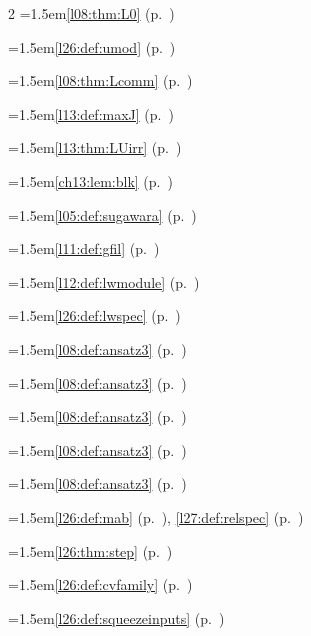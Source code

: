 \begin{multicols}{2}
\hangindent=1.5em\quad \ref{l08:thm:L0} (p.~\pageref{l08:thm:L0})\par
\hangindent=1.5em\quad \ref{l26:def:umod} (p.~\pageref{l26:def:umod})\par
\hangindent=1.5em\quad \ref{l08:thm:Lcomm} (p.~\pageref{l08:thm:Lcomm})\par
\hangindent=1.5em\quad \ref{l13:def:maxJ} (p.~\pageref{l13:def:maxJ})\par
\hangindent=1.5em\quad \ref{l13:thm:LUirr} (p.~\pageref{l13:thm:LUirr})\par
\hangindent=1.5em\quad \ref{ch13:lem:blk} (p.~\pageref{ch13:lem:blk})\par
\hangindent=1.5em\quad \ref{l05:def:sugawara} (p.~\pageref{l05:def:sugawara})\par
\hangindent=1.5em\quad \ref{l11:def:gfil} (p.~\pageref{l11:def:gfil})\par
\hangindent=1.5em\quad \ref{l12:def:lwmodule} (p.~\pageref{l12:def:lwmodule})\par
\hangindent=1.5em\quad \ref{l26:def:lwspec} (p.~\pageref{l26:def:lwspec})\par
\par{}\par\nopagebreak\smallskip
\hangindent=1.5em\quad \ref{l08:def:ansatz3} (p.~\pageref{l08:def:ansatz3})\par
\hangindent=1.5em\quad \ref{l08:def:ansatz3} (p.~\pageref{l08:def:ansatz3})\par
\hangindent=1.5em\quad \ref{l08:def:ansatz3} (p.~\pageref{l08:def:ansatz3})\par
\hangindent=1.5em\quad \ref{l08:def:ansatz3} (p.~\pageref{l08:def:ansatz3})\par
\hangindent=1.5em\quad \ref{l08:def:ansatz3} (p.~\pageref{l08:def:ansatz3})\par
\hangindent=1.5em\quad \ref{l26:def:mab} (p.~\pageref{l26:def:mab}), \ref{l27:def:relspec} (p.~\pageref{l27:def:relspec})\par
\hangindent=1.5em\quad \ref{l26:thm:step} (p.~\pageref{l26:thm:step})\par
\hangindent=1.5em\quad \ref{l26:def:cvfamily} (p.~\pageref{l26:def:cvfamily})\par
\hangindent=1.5em\quad \ref{l26:def:squeezeinputs} (p.~\pageref{l26:def:squeezeinputs})\par

\end{multicols}
